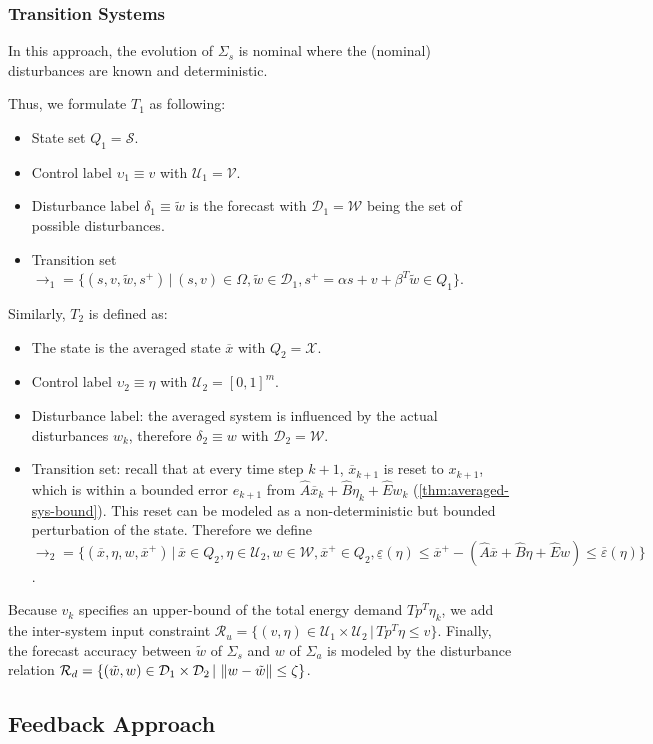 \subsubsection{Transition Systems}
\label{sec:abstraction-gs:feedforward:Ts}

In this approach, the evolution of $\Sigma_{s}$ is nominal where the (nominal) disturbances are known and deterministic.

Thus, we formulate $T_{1}$ as following:
\begin{itemize}
\item State set $Q_{1} = \mathcal{S}$.
\item Control label $\upsilon_{1} \equiv v$ with $\mathcal{U}_{1} = \mathcal{V}$.
\item Disturbance label $\delta_{1} \equiv \tilde{w}$ is the forecast with $\mathcal{D}_{1} = \mathcal{W}$ being the set of possible disturbances.
\item Transition set $\rightarrow_{1} = \{ (s, v, \tilde{w}, s^{+}) \,|\, (s,v) \in \Omega, \tilde{w} \in \mathcal{D}_{1}, s^{+} = \alpha s + v + \beta^{T} \tilde{w} \in Q_1\}$.
\end{itemize}
%
Similarly, $T_{2}$ is defined as:
\begin{itemize}
\item The state is the averaged state $\overbar{x}$ with $Q_{2} = \mathcal{X}$.
\item Control label $\upsilon_{2} \equiv \eta$ with $\mathcal{U}_{2} = [0,1]^{m}$.
\item Disturbance label: the averaged system is influenced by the actual disturbances $w_{k}$, therefore $\delta_{2} \equiv w$ with $\mathcal{D}_{2} = \mathcal{W}$.
\item Transition set: recall that at every time step $k+1$, $\overbar{x}_{k+1}$ is reset to $x_{k+1}$, which is within a bounded error $e_{k+1}$ from $\hat{A} \overbar{x}_{k} + \hat{B} \eta_k + \hat{E} w_{k}$ (\cf \cref{thm:averaged-sys-bound}).  This reset can be modeled as a non-deterministic but bounded perturbation of the state.  Therefore we define $\rightarrow_{2} = \{ (\overbar{x}, \eta, w, \overbar{x}^{+}) \,|\, \overbar{x} \in Q_{2}, \eta \in \mathcal{U}_{2}, w \in \mathcal{W}, \overbar{x}^{+} \in Q_2, \underline{\varepsilon} (\eta) \leq \overbar{x}^{+} - (\hat{A} \overbar{x}+ \hat{B} \eta + \hat{E} w) \leq \overbar{\varepsilon} (\eta) \}$.
\end{itemize}
%
Because $v_{k}$ specifies an upper-bound of the total energy demand $T p^{T} \eta_{k}$, we add the inter-system input constraint $\mathcal{R}_{u} = \{ (v, \eta) \in \mathcal{U}_{1} \times \mathcal{U}_{2} \,|\, T p^{T} \eta \leq v \}$.
Finally, the forecast accuracy between $\tilde{w}$ of $\Sigma_{s}$ and $w$ of $\Sigma_{a}$ is modeled by the disturbance relation $\mathcal{R}_{d} = \{ (\tilde{w}, w) \in \mathcal{D}_{1} \times \mathcal{D}_{2} \,|\, \left\lVert w - \tilde{w} \right\rVert \leq \zeta \}$.


\subsection{Feedback Approach}
\label{sec:abstraction-gs:feedback}






